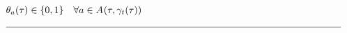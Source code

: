 \begin{alignat}{2}
	& \VarIncludeActivity{\ElementActivity} \in \{0, 1\}                                                                                                                                      \quad \forall \ElementActivity \in \SetActivity{\VarSupervisorAssignment{}{\ElementTechnician}}{}                                                                                                     \\ 
	& \text{\rule{\linewidth}{0.4pt}} \notag
\end{alignat}
\newpage

